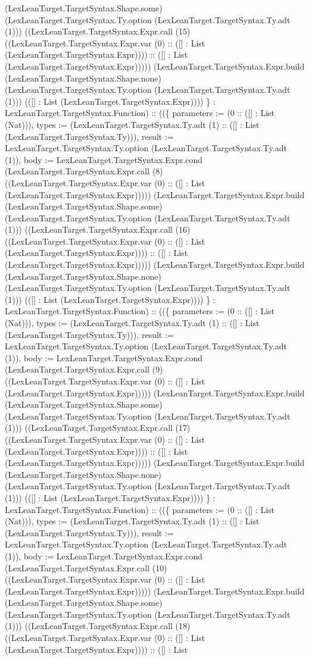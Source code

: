 \documentclass[11pt]{article}
\begin{document}
(LexLeanTarget.TargetSyntax.Shape.some) (LexLeanTarget.TargetSyntax.Ty.option (LexLeanTarget.TargetSyntax.Ty.adt (1))) ((LexLeanTarget.TargetSyntax.Expr.call (15) ((LexLeanTarget.TargetSyntax.Expr.var (0) :: ([] : List (LexLeanTarget.TargetSyntax.Expr)))) :: ([] : List (LexLeanTarget.TargetSyntax.Expr))))) (LexLeanTarget.TargetSyntax.Expr.build (LexLeanTarget.TargetSyntax.Shape.none) (LexLeanTarget.TargetSyntax.Ty.option (LexLeanTarget.TargetSyntax.Ty.adt (1))) (([] : List (LexLeanTarget.TargetSyntax.Expr)))) \} : LexLeanTarget.TargetSyntax.Function) :: ((\{ parameters := (0 :: ([] : List (Nat))), types := (LexLeanTarget.TargetSyntax.Ty.adt (1) :: ([] : List (LexLeanTarget.TargetSyntax.Ty))), result := LexLeanTarget.TargetSyntax.Ty.option (LexLeanTarget.TargetSyntax.Ty.adt (1)), body := LexLeanTarget.TargetSyntax.Expr.cond (LexLeanTarget.TargetSyntax.Expr.call (8) ((LexLeanTarget.TargetSyntax.Expr.var (0) :: ([] : List (LexLeanTarget.TargetSyntax.Expr))))) (LexLeanTarget.TargetSyntax.Expr.build (LexLeanTarget.TargetSyntax.Shape.some) (LexLeanTarget.TargetSyntax.Ty.option (LexLeanTarget.TargetSyntax.Ty.adt (1))) ((LexLeanTarget.TargetSyntax.Expr.call (16) ((LexLeanTarget.TargetSyntax.Expr.var (0) :: ([] : List (LexLeanTarget.TargetSyntax.Expr)))) :: ([] : List (LexLeanTarget.TargetSyntax.Expr))))) (LexLeanTarget.TargetSyntax.Expr.build (LexLeanTarget.TargetSyntax.Shape.none) (LexLeanTarget.TargetSyntax.Ty.option (LexLeanTarget.TargetSyntax.Ty.adt (1))) (([] : List (LexLeanTarget.TargetSyntax.Expr)))) \} : LexLeanTarget.TargetSyntax.Function) :: ((\{ parameters := (0 :: ([] : List (Nat))), types := (LexLeanTarget.TargetSyntax.Ty.adt (1) :: ([] : List (LexLeanTarget.TargetSyntax.Ty))), result := LexLeanTarget.TargetSyntax.Ty.option (LexLeanTarget.TargetSyntax.Ty.adt (1)), body := LexLeanTarget.TargetSyntax.Expr.cond (LexLeanTarget.TargetSyntax.Expr.call (9) ((LexLeanTarget.TargetSyntax.Expr.var (0) :: ([] : List (LexLeanTarget.TargetSyntax.Expr))))) (LexLeanTarget.TargetSyntax.Expr.build (LexLeanTarget.TargetSyntax.Shape.some) (LexLeanTarget.TargetSyntax.Ty.option (LexLeanTarget.TargetSyntax.Ty.adt (1))) ((LexLeanTarget.TargetSyntax.Expr.call (17) ((LexLeanTarget.TargetSyntax.Expr.var (0) :: ([] : List (LexLeanTarget.TargetSyntax.Expr)))) :: ([] : List (LexLeanTarget.TargetSyntax.Expr))))) (LexLeanTarget.TargetSyntax.Expr.build (LexLeanTarget.TargetSyntax.Shape.none) (LexLeanTarget.TargetSyntax.Ty.option (LexLeanTarget.TargetSyntax.Ty.adt (1))) (([] : List (LexLeanTarget.TargetSyntax.Expr)))) \} : LexLeanTarget.TargetSyntax.Function) :: ((\{ parameters := (0 :: ([] : List (Nat))), types := (LexLeanTarget.TargetSyntax.Ty.adt (1) :: ([] : List (LexLeanTarget.TargetSyntax.Ty))), result := LexLeanTarget.TargetSyntax.Ty.option (LexLeanTarget.TargetSyntax.Ty.adt (1)), body := LexLeanTarget.TargetSyntax.Expr.cond (LexLeanTarget.TargetSyntax.Expr.call (10) ((LexLeanTarget.TargetSyntax.Expr.var (0) :: ([] : List (LexLeanTarget.TargetSyntax.Expr))))) (LexLeanTarget.TargetSyntax.Expr.build (LexLeanTarget.TargetSyntax.Shape.some) (LexLeanTarget.TargetSyntax.Ty.option (LexLeanTarget.TargetSyntax.Ty.adt (1))) ((LexLeanTarget.TargetSyntax.Expr.call (18) ((LexLeanTarget.TargetSyntax.Expr.var (0) :: ([] : List (LexLeanTarget.TargetSyntax.Expr)))) :: ([] : List 
\end{document}
